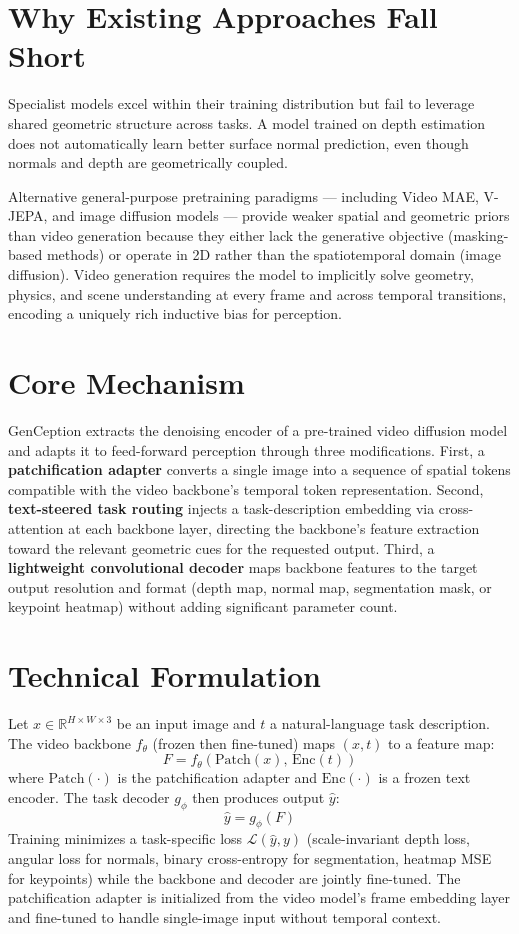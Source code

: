 \documentclass[10pt,twocolumn]{article}
\begin{document}
\section{Why Existing Approaches Fall Short}

Specialist models excel within their training distribution but fail
to leverage shared geometric structure across tasks.
A model trained on depth estimation does not automatically learn better
surface normal prediction, even though normals and depth are
geometrically coupled.

Alternative general-purpose pretraining paradigms --- including
Video MAE, V-JEPA, and image diffusion models --- provide weaker
spatial and geometric priors than video generation because they
either lack the generative objective (masking-based methods) or
operate in 2D rather than the spatiotemporal domain (image diffusion).
Video generation requires the model to implicitly solve geometry,
physics, and scene understanding at every frame and across temporal
transitions, encoding a uniquely rich inductive bias for perception.

\section{Core Mechanism}

GenCeption extracts the denoising encoder of a pre-trained video
diffusion model and adapts it to feed-forward perception through
three modifications.
First, a \textbf{patchification adapter} converts a single image
into a sequence of spatial tokens compatible with the video backbone's
temporal token representation.
Second, \textbf{text-steered task routing} injects a task-description
embedding via cross-attention at each backbone layer, directing
the backbone's feature extraction toward the relevant geometric cues
for the requested output.
Third, a \textbf{lightweight convolutional decoder} maps backbone
features to the target output resolution and format (depth map,
normal map, segmentation mask, or keypoint heatmap) without
adding significant parameter count.

\section{Technical Formulation}

Let $x \in \mathbb{R}^{H \times W \times 3}$ be an input image
and $t$ a natural-language task description.
The video backbone $f_\theta$ (frozen then fine-tuned) maps
$(x, t)$ to a feature map:
\[
F = f_\theta(\text{Patch}(x),\, \text{Enc}(t))
\]
where $\text{Patch}(\cdot)$ is the patchification adapter and
$\text{Enc}(\cdot)$ is a frozen text encoder.
The task decoder $g_\phi$ then produces output $\hat{y}$:
\[
\hat{y} = g_\phi(F)
\]
Training minimizes a task-specific loss $\mathcal{L}(\hat{y}, y)$
(scale-invariant depth loss, angular loss for normals,
binary cross-entropy for segmentation, heatmap MSE for keypoints)
while the backbone and decoder are jointly fine-tuned.
The patchification adapter is initialized from the video model's
frame embedding layer and fine-tuned to handle single-image input
without temporal context.
\end{document}
